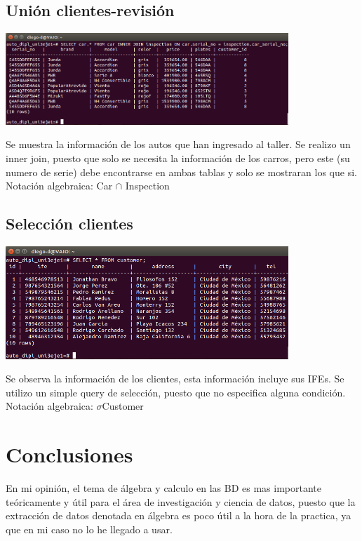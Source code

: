 \documentclass[spanish,12pt,letterpapper]{article}
\begin{document}
	\subsection{Unión clientes-revisión}
	\begin{center}
	\includegraphics[width=0.8\textwidth]{./images/h}~\\[1cm]
	\end{center}
	Se muestra la información de los autos que han ingresado al taller. Se realizo un inner join, puesto que solo se necesita la información de los carros, pero este (su numero de serie) debe encontrarse en ambas tablas y solo se mostraran los que si.\\
	
	Notación algebraica: Car \(\cap\) Inspection
	
	\subsection{Selección clientes}
	\begin{center}
	\includegraphics[width=0.8\textwidth]{./images/i}~\\[1cm]
	\end{center}
	Se observa la información de los clientes, esta información incluye sus IFEs. Se utilizo un simple query de selección, puesto que no especifica alguna condición.\\
	
	Notación algebraica:  \(\sigma\)Customer
	
	\section{Conclusiones}
	En mi opinión, el tema de álgebra y calculo en las BD es mas importante teóricamente y útil para el área de investigación y ciencia de datos, puesto que la extracción de datos denotada en álgebra es poco útil a la hora de la practica, ya que en mi caso no lo he llegado a usar.
	
\end{document}
